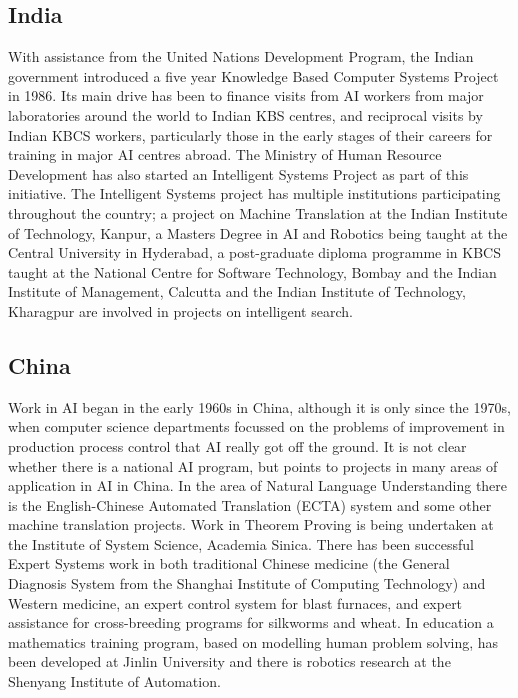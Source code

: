 \subsection{India}
With assistance from the United Nations Development Program, the
Indian government introduced a five year Knowledge Based
Computer Systems Project in 1986. Its main drive has been to finance
visits from AI workers from major laboratories around the world to
Indian KBS centres, and reciprocal visits by Indian KBCS workers,
particularly those in the early stages of their careers for training
in major AI centres abroad. The Ministry of Human Resource Development
has also started an Intelligent Systems Project as part of this
initiative. The Intelligent Systems project has multiple institutions
participating throughout the country; a project on Machine Translation at
the Indian Institute of Technology, Kanpur, a Masters Degree in AI and
Robotics being taught at the Central University in Hyderabad,  a
post-graduate diploma programme in KBCS taught at the National
Centre for Software Technology, Bombay and the Indian Institute of
Management, Calcutta and the Indian Institute of Technology, Kharagpur
are involved in projects on intelligent search.  

\subsection{China}
Work in AI began in the early 1960s in China, although it is only since
the 1970s, when computer science departments focussed on the problems
of improvement in production process control that AI really got off
the ground. It is not clear whether there is a national AI program,
but \cite{xinsong83} points to projects in many areas of 
application in AI in China. In the area of Natural Language
Understanding there is  the English-Chinese
Automated Translation (ECTA) system and some other machine translation
projects. Work in Theorem Proving is being undertaken at the Institute
of System Science, Academia Sinica. There has been successful
Expert Systems work in both traditional Chinese medicine (the General
Diagnosis System from the Shanghai Institute of Computing Technology)
and Western medicine, an expert control system for blast furnaces,
and expert assistance for cross-breeding programs for silkworms and
wheat. In education a mathematics training program, based on modelling
human problem solving, has been developed at Jinlin University and
there is robotics research at the Shenyang Institute of Automation.

